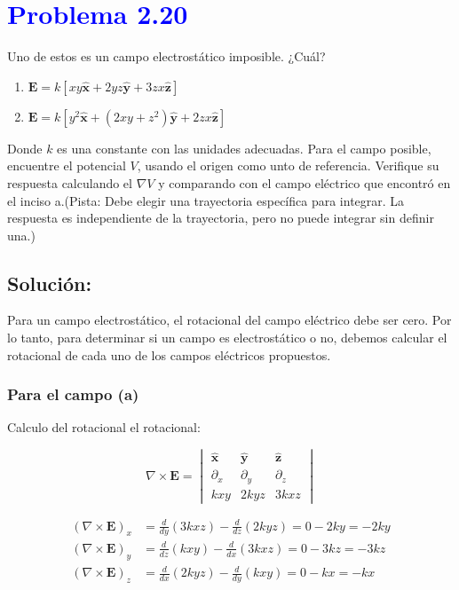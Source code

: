 \documentclass[12pt]{article}
\newcommand{\question}[1]{\textcolor{blue}{\textbf{#1}}}
\begin{document}
\section*{\question{ Problema 2.20}} Uno de estos es un campo electrostático imposible. ¿Cuál?

\begin{enumerate}[label=(\alph*)]
    \item  \(\mathbf{E} = k[xy \mathbf{ \hat{x}}+ 2yz\mathbf{ \hat{y}}+ 3zx\mathbf{ \hat{z}}] \)
    \item \(\mathbf{E} = k[y^2\mathbf{ \hat{x}}+ (2xy + z^2)\mathbf{ \hat{y}}+ 2zx\mathbf{ \hat{z}}] \)
\end{enumerate}

Donde \(k\)  es una constante con las unidades adecuadas. Para el campo posible, encuentre el potencial \(V\), usando el origen como unto de referencia. Verifique su respuesta calculando el \(\nabla V\) y comparando con el campo eléctrico que encontró en el inciso a.(Pista: Debe elegir una trayectoria específica para integrar. La respuesta es independiente de la trayectoria, pero no puede integrar sin definir una.)

\subsection*{Solución:}
Para un campo electrostático, el rotacional del campo eléctrico debe ser cero. Por lo tanto, para determinar si un campo es electrostático o no, debemos calcular el rotacional de cada uno de los campos eléctricos propuestos.

\subsubsection*{Para el campo (a)}

Calculo del rotacional el rotacional:

\[
\nabla \times \mathbf{E} = 
\begin{vmatrix}
\hat{\mathbf{x}} & \hat{\mathbf{y}} & \hat{\mathbf{z}} \\
\partial_x & \partial_y & \partial_z \\
kxy & 2k yz & 3k xz
\end{vmatrix}
\]

\begin{align*}
(\nabla \times \mathbf{E})_x &= \frac{d}{dy} (3kxz) - \frac{d}{dz} (2kyz) = 0 - 2ky = -2ky \\
(\nabla \times \mathbf{E})_y &= \frac{d}{dz} (kxy) - \frac{d}{dx} (3kxz) = 0 - 3kz = -3kz \\
(\nabla \times \mathbf{E})_z &= \frac{d}{dx} (2kyz) - \frac{d}{dy} (kxy) = 0 - kx = -kx
\end{align*}
\end{document}

